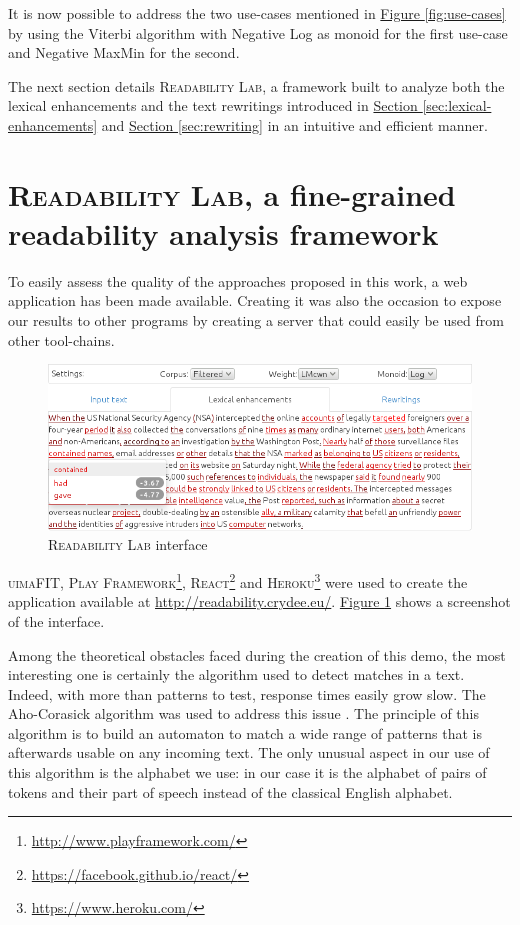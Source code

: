 \documentclass[a4paper, 11pt, onepage]{scrreprt}
\newcommand\figureref[1]{\hyperref[#1]{Figure \ref*{#1}}}
\newcommand\sectionref[1]{\hyperref[#1]{Section \ref*{#1}}}
\begin{document}
It is now possible to address the two use-cases mentioned in
\figureref{fig:use-cases} by using the Viterbi algorithm
\cite{forney1973viterbi} with Negative Log as monoid for the first
use-case and Negative MaxMin for the second.

The next section details \textsc{Readability Lab}, a framework built
to analyze both the lexical enhancements and the text rewritings
introduced in \sectionref{sec:lexical-enhancements}
and \sectionref{sec:rewriting} in an intuitive and efficient manner.

\section{\textsc{Readability Lab}, a fine-grained readability analysis
  framework}
\label{sec:framework}

To easily assess the quality of the approaches proposed in this work,
a web application has been made available. Creating it was also the
occasion to expose our results to other programs by creating a server
that could easily be used from other tool-chains.

\begin{figure}[h]
  \centering
  \includegraphics[width=\textwidth]{ui}
  \caption{\textsc{Readability Lab} interface}
  \label{fig:ui}
\end{figure}

\textsc{uimaFIT}, \textsc{Play
  Framework}\footnote{\url{http://www.playframework.com/}},
\textsc{React}\footnote{\url{https://facebook.github.io/react/}} and
\textsc{Heroku}\footnote{\url{https://www.heroku.com/}} were used to
create the application available at
\url{http://readability.crydee.eu/}. \figureref{fig:ui} shows a
screenshot of the interface.

Among the theoretical obstacles faced during the creation of this
demo, the most interesting one is certainly the algorithm used to
detect matches in a text. Indeed, with more than 
patterns to test, response times easily grow slow. The Aho-Corasick
algorithm was used to address this issue \cite{aho1975efficient}. The
principle of this algorithm is to build an automaton to match a wide
range of patterns that is afterwards usable on any incoming text. The
only unusual aspect in our use of this algorithm is the alphabet we
use: in our case it is the alphabet of pairs of tokens and their part
of speech instead of the classical English alphabet.
\end{document}
